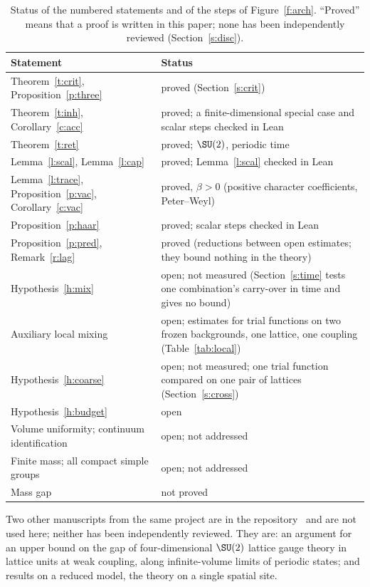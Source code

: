 \begin{table}[ht]
\centering\small
\begin{tabular}{@{}>{\raggedright\arraybackslash}p{}>{\raggedright\arraybackslash}p{}@{}}
\toprule
Statement & Status \\
\midrule
Theorem~\ref{t:crit}, Proposition~\ref{p:three} & proved (Section~\ref{s:crit}) \\
Theorem~\ref{t:inh}, Corollary~\ref{c:acc} & proved; a finite-dimensional special case and scalar steps checked in Lean \\
Theorem~\ref{t:ret} & proved; $\SU(2)$, periodic time \\
Lemma~\ref{l:scal}, Lemma~\ref{l:cap} & proved; Lemma~\ref{l:scal} checked in Lean \\
Lemma~\ref{l:trace}, Proposition~\ref{p:vac}, Corollary~\ref{c:vac} & proved, $\beta>0$ (positive character coefficients, Peter--Weyl) \\
Proposition~\ref{p:haar} & proved; scalar steps checked in Lean \\
Proposition~\ref{p:pred}, Remark~\ref{r:lag} & proved (reductions between open estimates; they bound nothing in the theory) \\
Hypothesis~\ref{h:mix} & open; not measured (Section~\ref{s:time} tests one combination's carry-over in time and gives no bound) \\
Auxiliary local mixing & open; estimates for trial functions on two frozen backgrounds, one lattice, one coupling (Table~\ref{tab:local}) \\
Hypothesis~\ref{h:coarse} & open; not measured; one trial function compared on one pair of lattices (Section~\ref{s:cross}) \\
Hypothesis~\ref{h:budget} & open \\
Volume uniformity; continuum identification & open; not addressed \\
Finite mass; all compact simple groups & open; not addressed \\
Mass gap & not proved \\
\bottomrule
\end{tabular}
\caption{Status of the numbered statements and of the steps of Figure~\ref{f:arch}. ``Proved'' means that a
proof is written in this paper; none has been independently reviewed (Section~\ref{s:disc}).}\label{tab:status}
\end{table}

Two other manuscripts from the same project are in the repository~\cite{Repo} and are not used here; neither has
been independently reviewed. They are: an argument for an
upper bound on the gap of four-dimensional $\SU(2)$ lattice gauge theory in lattice units at weak coupling,
along infinite-volume limits of periodic states; and results on a reduced model, the theory on a single
spatial site.

